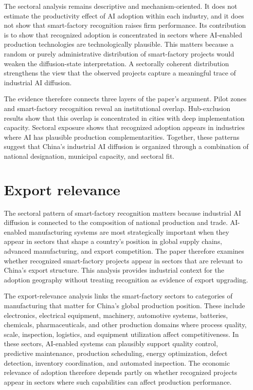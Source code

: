 \documentclass[12pt]{article}
\begin{document}
The sectoral analysis remains descriptive and mechanism-oriented. It does not estimate the productivity effect of AI adoption within each industry, and it does not show that smart-factory recognition raises firm performance. Its contribution is to show that recognized adoption is concentrated in sectors where AI-enabled production technologies are technologically plausible. This matters because a random or purely administrative distribution of smart-factory projects would weaken the diffusion-state interpretation. A sectorally coherent distribution strengthens the view that the observed projects capture a meaningful trace of industrial AI diffusion.

The evidence therefore connects three layers of the paper's argument. Pilot zones and smart-factory recognition reveal an institutional overlap. Hub-exclusion results show that this overlap is concentrated in cities with deep implementation capacity. Sectoral exposure shows that recognized adoption appears in industries where AI has plausible production complementarities. Together, these patterns suggest that China's industrial AI diffusion is organized through a combination of national designation, municipal capacity, and sectoral fit.

\section{Export relevance}
\label{sec:export}

The sectoral pattern of smart-factory recognition matters because industrial AI diffusion is connected to the composition of national production and trade. AI-enabled manufacturing systems are most strategically important when they appear in sectors that shape a country's position in global supply chains, advanced manufacturing, and export competition. The paper therefore examines whether recognized smart-factory projects appear in sectors that are relevant to China's export structure. This analysis provides industrial context for the adoption geography without treating recognition as evidence of export upgrading.

The export-relevance analysis links the smart-factory sectors to categories of manufacturing that matter for China's global production position. These include electronics, electrical equipment, machinery, automotive systems, batteries, chemicals, pharmaceuticals, and other production domains where process quality, scale, inspection, logistics, and equipment utilization affect competitiveness. In these sectors, AI-enabled systems can plausibly support quality control, predictive maintenance, production scheduling, energy optimization, defect detection, inventory coordination, and automated inspection. The economic relevance of adoption therefore depends partly on whether recognized projects appear in sectors where such capabilities can affect production performance.
\end{document}

